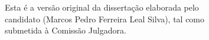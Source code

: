 \documentclass[11pt,twoside,a4paper]{book}
\begin{document}
    \vskip 2cm

    \begin{flushright}
	Esta é a versão original da dissertação elaborada pelo\\
	candidato (Marcos Pedro Ferreira Leal Silva), tal como \\
	submetida à Comissão Julgadora.
    \end{flushright}

\pagebreak


%
%
%
%





    
      
\end{document}
